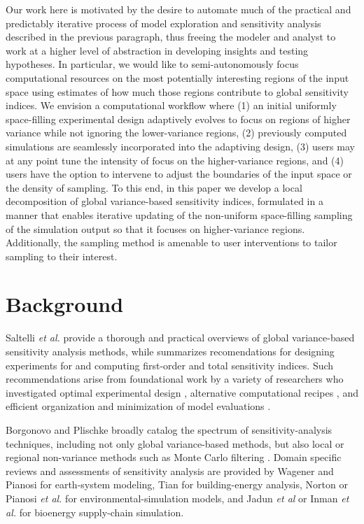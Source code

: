 \documentclass[12pt]{article}
\begin{document}
Our work here is motivated by the desire to automate much of the practical and predictably iterative process of model exploration and sensitivity analysis described in the previous paragraph, thus freeing the modeler and analyst to work at a higher level of abstraction in developing insights and testing hypotheses. In particular, we would like to semi-autonomously focus computational resources on the most potentially interesting regions of the input space using estimates of how much those regions contribute to global sensitivity indices. We envision a computational workflow where (1) an initial uniformly space-filling experimental design adaptively evolves to focus on regions of higher variance while not ignoring the lower-variance regions, (2) previously computed simulations are seamlessly incorporated into the adaptiving design, (3) users may at any point tune the intensity of focus on the higher-variance regions, and (4) users have the option to intervene to adjust the boundaries of the input space or the density of sampling. To this end, in this paper we develop a local decomposition of global variance-based sensitivity indices, formulated in a manner that enables iterative updating of the non-uniform space-filling sampling of the simulation output so that it focuses on higher-variance regions. Additionally, the sampling method is amenable to user interventions to tailor sampling to their interest.


\section{Background}

Saltelli \textit{et al.} \cite{saltelli_sensitivity_2004} \cite{saltelli_global_2008} provide a thorough and practical overviews of global variance-based sensitivity analysis methods, while \cite{saltelli_variance_2010} summarizes recomendations for designing experiments for and computing first-order and total sensitivity indices. Such recommendations arise from foundational work by a variety of researchers who investigated optimal experimental design \cite{jansen_analysis_1999} \cite{saltelli_variance_2010}, alternative computational recipes \cite{saltelli_variance_2010}, and efficient organization and minimization of model evaluations \cite{saltelli_making_2002} \cite{piano_new_2019} \cite{kucherenko_estimation_2012}.

Borgonovo and Plischke \cite{borgonovo_sensitivity_2016} broadly catalog the spectrum of sensitivity-analysis techniques, including not only global variance-based methods, but also local or regional non-variance methods such as Monte Carlo filtering \cite{wu_application_2017}. Domain specific reviews and assessments of sensitivity analysis are provided by Wagener and Pianosi \cite{wagener_what_2019} for earth-system modeling, Tian \cite{tian_review_2013} for building-energy analysis, Norton \cite{norton_introduction_2015} or Pianosi \textit{et al.} \cite{pianosi_sensitivity_2016} for environmental-simulation models, and Jadun \textit{et al} \cite{jadun_application_2017} or Inman \textit{et al.} \cite{inman_application_2018} for bioenergy supply-chain simulation.
\end{document}
